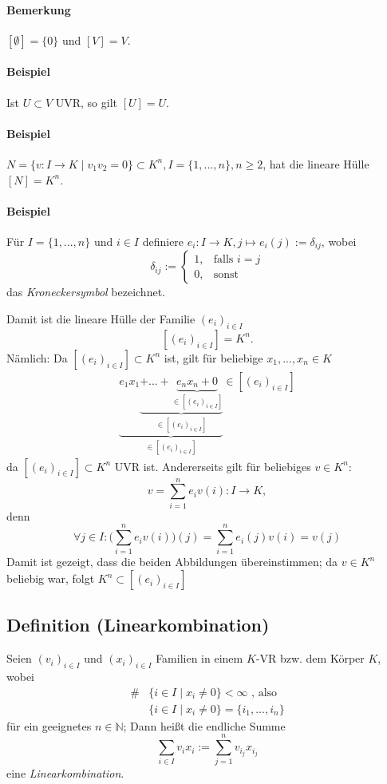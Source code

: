 \paragraph{Bemerkung}
	$[\emptyset ] = \{0\}$ und $[V] = V$.

\paragraph{Beispiel}
	Ist $U\subset V$ UVR, so gilt $[U] = U$.

\paragraph{Beispiel}
	$N=\{v:I\to K\mid v_1v_2=0\} \subset K^n,I=\{1,...,n\},n\geq 2$, hat die lineare Hülle $[N]=K^n$.

\paragraph{Beispiel}
	Für $I=\{1,...,n\}$ und $i\in I$ definiere
	$e_i:I\to K , j\mapsto e_i(j):= \delta_{ij}$, wobei 
	\begin{equation*}
		\delta_{ij} :=
		\begin{cases}
			1,& \text{falls }i=j\\
			0,& \text{sonst}
		\end{cases}
	\end{equation*}
	das \emph{Kroneckersymbol} bezeichnet.
	
	Damit ist die lineare Hülle der Familie $(e_i)_{i\in I}$
		\[ [(e_i)_{i\in I}] = K^n. \]
	Nämlich: Da $[(e_i)_{i\in I}]\subset K^n$ ist, gilt für beliebige $x_1,...,x_n\in K$
	\begin{gather*}
		\underbrace{e_1x_1\underbrace{+...+\underbrace{e_nx_n + 0}_{\in [(e_i)_{i\in I}]}}_{\in [(e_i)_{i\in I}]}}_{\in [(e_i)_{i\in I}]}\in [(e_i)_{i\in I}]
	\end{gather*}
	da $[(e_i)_{i\in I}] \subset K^n$ UVR ist. 
	Andererseits gilt für beliebiges $v\in K^n$:
		\[ v=\sum^n_{i=1}e_iv(i): I\to K, \]	
	denn
		\[ \forall j\in I: \bigg(\sum^n_{i=1} e_iv(i)\bigg)(j) = \sum^n_{i=1}e_i(j)v(i) = v(j) \]
	Damit ist gezeigt, dass die beiden Abbildungen übereinstimmen; da $v\in K^n$ beliebig war, folgt $K^n \subset [(e_i)_{i\in I}]$
	
\subsection{Definition (Linearkombination)}
	\begin{Definition}
		Seien $(v_i)_{i\in I}$ und $(x_i)_{i\in I}$ Familien in einem $ K $-VR bzw. dem Körper $ K $, wobei
	\begin{align*}
		\# &\{i\in I\mid x_i \neq 0\} < \infty\text{ , also}\\
		   &\{i\in I \mid x_i \neq 0\} = \{i_1,...,i_n\}
        \end{align*}
        für ein geeignetes  $n\in \mathbb{N}$;
    	Dann heißt die endliche Summe
            \[\sum_{i\in I} v_ix_i:= \sum^n_{j=1}v_{i_j}x_{i_j}\]
        eine \emph{Linearkombination}.
	\end{Definition}
	
